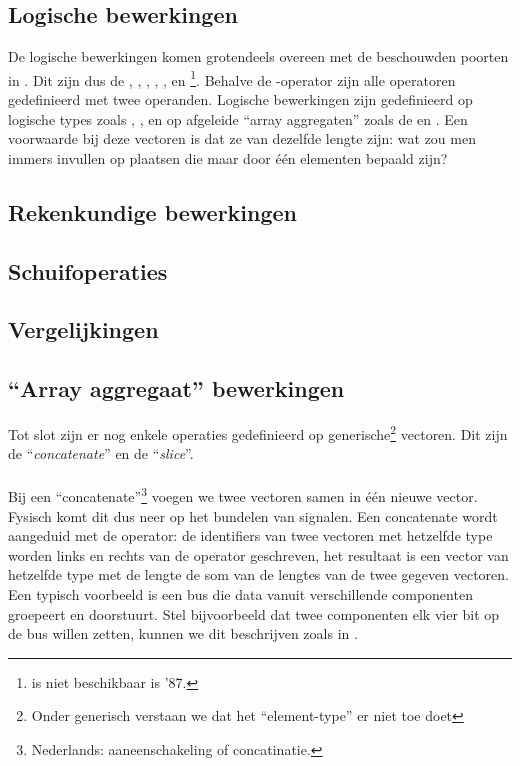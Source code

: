 \subsection{Logische bewerkingen}
De logische bewerkingen komen grotendeels overeen met de beschouwden poorten in . Dit zijn dus de , , , , ,  en \footnote{ is niet beschikbaar is \tvhdl{}'87.}. Behalve de -operator zijn alle operatoren gedefinieerd met twee operanden. Logische bewerkingen zijn gedefinieerd op logische types zoals , ,  en op afgeleide ``array aggregaten'' zoals de  en . Een voorwaarde bij deze vectoren is dat ze van dezelfde lengte zijn: wat zou men immers invullen op plaatsen die maar door \'e\'en elementen bepaald zijn?

\paragraph{}

\subsection{Rekenkundige bewerkingen}

\subsection{Schuifoperaties}

\subsection{Vergelijkingen}

\subsection{``Array aggregaat'' bewerkingen}
Tot slot zijn er nog enkele operaties gedefinieerd op generische\footnote{Onder generisch verstaan we dat het ``element-type'' er niet toe doet} vectoren. Dit zijn de ``\emph{concatenate}'' en de ``\emph{slice}''.

\paragraph{}
Bij een ``concatenate''\footnote{Nederlands: aaneenschakeling of concatinatie.} voegen we twee vectoren samen in \'e\'en nieuwe vector. Fysisch komt dit dus neer op het bundelen van signalen. Een concatenate wordt aangeduid met de \vhdltermen{\&} operator: de identifiers van twee vectoren met hetzelfde type worden links en rechts van de operator geschreven, het resultaat is een vector van hetzelfde type met de lengte de som van de lengtes van de twee gegeven vectoren. Een typisch voorbeeld is een bus die data vanuit verschillende componenten groepeert en doorstuurt. Stel bijvoorbeeld dat twee componenten elk vier bit op de bus willen zetten, kunnen we dit beschrijven zoals in .

